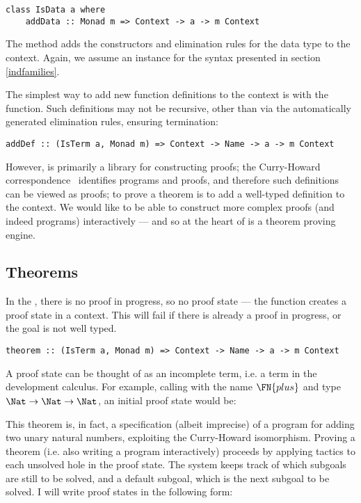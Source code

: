 \begin{verbatim}
class IsData a where
    addData :: Monad m => Context -> a -> m Context
\end{verbatim}

The  method adds the constructors and elimination
rules for the data type to the context. Again, we assume an instance
for the syntax presented in section \ref{indfamilies}.

The simplest way to add new function definitions to the context is
with the  function. Such definitions may not be recursive,
other than via the automatically generated elimination rules, ensuring
termination:

\begin{verbatim}
addDef :: (IsTerm a, Monad m) => Context -> Name -> a -> m Context
\end{verbatim}

However, \Ivor{} is primarily a library for constructing proofs; the
Curry-Howard correspondence~\cite{curry-feys,howard} identifies
programs and proofs, and therefore such definitions can be viewed as
proofs; to prove a theorem is to add a well-typed definition to the
context.  We would like to be able to construct more complex proofs
(and indeed programs) interactively --- and so at the heart of \Ivor{}
is a theorem proving engine.

\subsection{Theorems}

In the , there is no proof in progress, so no
proof state --- the  function creates a proof state in
a context. This will fail if there is already a proof in progress, or
the goal is not well typed.

\begin{verbatim}
theorem :: (IsTerm a, Monad m) => Context -> Name -> a -> m Context
\end{verbatim}

A proof state can be thought of as an incomplete term, i.e. a
term in the development calculus. 
For example, calling 
with the name $\FN{plus}$ and type $\Nat\to\Nat\to\Nat$, an initial
proof state would be:


This theorem is, in fact, a specification (albeit imprecise) of a
program for adding two unary natural numbers, exploiting the
Curry-Howard isomorphism.  Proving a theorem (i.e. also writing a
program interactively) proceeds by applying tactics to each unsolved
hole in the proof state. The system keeps track of which subgoals are
still to be solved, and a default subgoal, which is the next subgoal
to be solved. I will write proof states in the following form:

